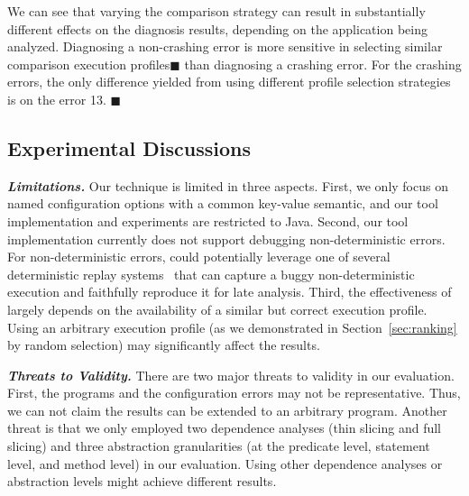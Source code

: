 We can see that varying the comparison strategy can result in
substantially different effects on the diagnosis results,
depending on the application being analyzed. Diagnosing
a non-crashing error is more sensitive in selecting similar
comparison execution profiles$\blacksquare$ than diagnosing
a crashing error.
For the \crash crashing errors, the only difference yielded
from using different profile selection strategies is on
the error 13. $\blacksquare$




\subsection{Experimental Discussions}


\noindent \textbf{\textit{Limitations.}} 
Our technique is limited in three aspects.
First, we only focus on named configuration options
with a common key-value semantic, and our tool implementation
and experiments are
restricted to Java. 
Second,  our tool implementation currently does not
support debugging non-deterministic errors. 
For non-deterministic errors, \ourtool could potentially leverage one of
several deterministic replay systems~\cite{Huang:2010:LLD}
that can capture a buggy non-deterministic
execution and faithfully reproduce it for late analysis.
Third, the effectiveness of \ourtool largely
depends on the availability of a similar but correct execution profile.
Using an arbitrary execution profile (as we demonstrated in Section~\ref{sec:ranking}
by random selection) may significantly affect the results.







\vspace{1mm}

\noindent \textbf{\textit{Threats to Validity.}} 
There are two major threats to validity in our evaluation. 
First, the \subjectnum programs and the configuration errors may not be
representative. Thus, we can not claim the results can be
extended to an arbitrary program.
Another threat is that we only employed two dependence
analyses (thin slicing and full slicing) and three
abstraction granularities (at the predicate level,
statement level, and method level) in our evaluation.
 Using other dependence analyses or abstraction levels
might achieve different results.



